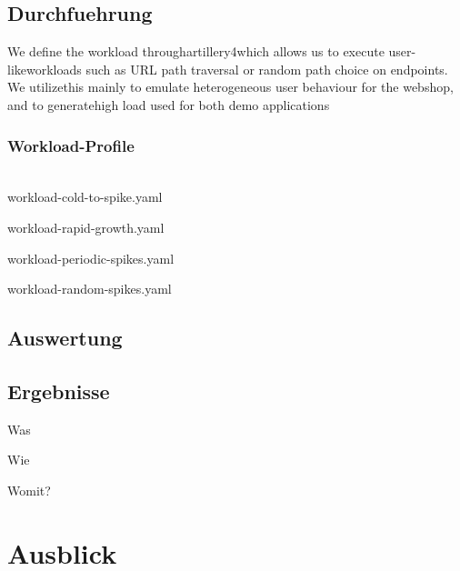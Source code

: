 \documentclass[runningheads]{llncs}
\begin{document}
\subsection{Durchfuehrung}

We define the workload throughartillery4which allows us to execute user-likeworkloads such as URL path traversal or random path choice on endpoints. We utilizethis mainly to emulate heterogeneous user behaviour for the webshop, and to generatehigh load used for both demo applications

\subsubsection{Workload-Profile} \hfill\\

workload-cold-to-spike.yaml

workload-rapid-growth.yaml

workload-periodic-spikes.yaml

workload-random-spikes.yaml

\subsection{Auswertung}

\subsection{Ergebnisse}
Was

Wie

Womit?


	
	
\section{Ausblick}
	
%
%
\newpage


%
\end{document}
